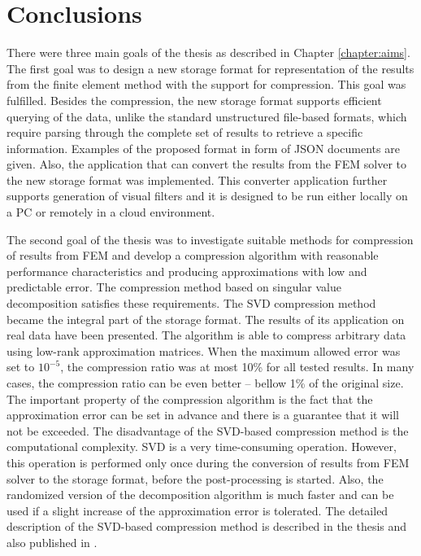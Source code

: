 \chapter{Conclusions}

There were three main goals of the thesis as described in Chapter \ref{chapter:aims}. The first goal was to design a new storage format for representation of the results from the finite element method with the support for compression. This goal was fulfilled. Besides the compression, the new storage format supports efficient querying of the data, unlike the standard unstructured file-based formats, which require parsing through the complete set of results to retrieve a specific information. Examples of the proposed format in form of JSON documents are given. Also, the application that can convert the results from the FEM solver to the new storage format was implemented. This converter application further supports generation of visual filters and it is designed to be run either locally on a PC or remotely in a cloud environment.

The second goal of the thesis was to investigate suitable methods for compression of results from FEM and develop a compression algorithm with reasonable performance characteristics and producing approximations with low and predictable error. The compression method based on singular value decomposition satisfies these requirements. The SVD compression method became the integral part of the storage format. The results of its application on real data have been presented. The algorithm is able to compress arbitrary data using low-rank approximation matrices. When the maximum allowed error was set to $10^{-5}$, the compression ratio was at most 10\% for all tested results. In many cases, the compression ratio can be even better -- bellow 1\% of the original size. The important property of the compression algorithm is the fact that the approximation error can be set in advance and there is a guarantee that it will not be exceeded. The disadvantage of the SVD-based compression method is the computational complexity. SVD is a very time-consuming operation. However, this operation is performed only once during the conversion of results from FEM solver to the storage format, before the post-processing is started. Also, the randomized version of the decomposition algorithm is much faster and can be used if a slight increase of the approximation error is tolerated. The detailed description of the SVD-based compression method is described in the thesis and also published in \cite{Benes2018}.

